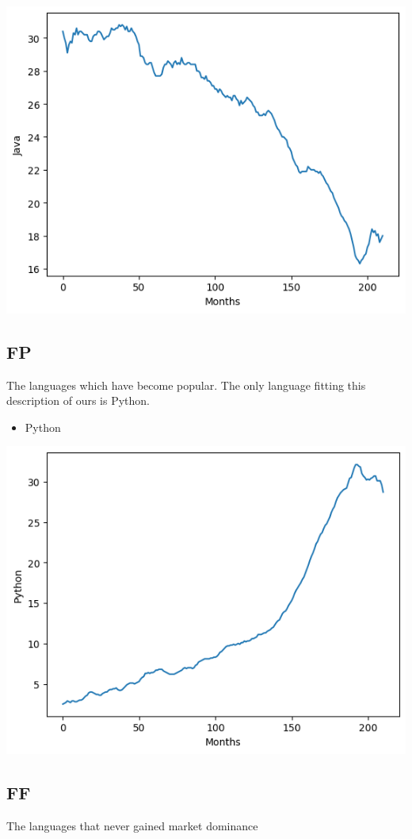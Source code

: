 \documentclass[conference]{IEEEtran}
\begin{document}
\includegraphics[scale=0.4]{lineplot/java.png}

\subsection{FP}
The languages which have become popular. The only language fitting this description of ours is Python.
\begin{itemize}
\item{Python}
\end{itemize}

\includegraphics[scale=0.4]{lineplot/python.png}

\subsection{FF}
The languages that never gained market dominance
\end{document}
